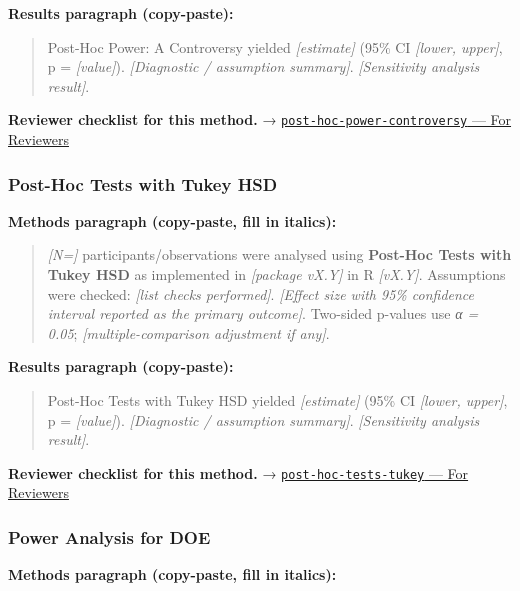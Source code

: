 \documentclass[
]{article}
\begin{document}
\textbf{Results paragraph (copy-paste):}

\begin{quote}
Post-Hoc Power: A Controversy yielded \emph{{[}estimate{]}} (95\% CI
\emph{{[}lower, upper{]}}, p = \emph{{[}value{]}}). \emph{{[}Diagnostic
/ assumption summary{]}}. \emph{{[}Sensitivity analysis result{]}}.
\end{quote}

\textbf{Reviewer checklist for this method.} →
\href{../chapters/05-power/post-hoc-power-controversy.Rmd\#for-reviewers}{\texttt{post-hoc-power-controversy}
--- For Reviewers}

\subsubsection{Post-Hoc Tests with Tukey
HSD}\label{post-hoc-tests-with-tukey-hsd}

\textbf{Methods paragraph (copy-paste, fill in italics):}

\begin{quote}
\emph{{[}N={]}} participants/observations were analysed using
\textbf{Post-Hoc Tests with Tukey HSD} as implemented in
\emph{{[}package vX.Y{]}} in R \emph{{[}vX.Y{]}}. Assumptions were
checked: \emph{{[}list checks performed{]}}. \emph{{[}Effect size with
95\% confidence interval reported as the primary outcome{]}}. Two-sided
p-values use \emph{α = 0.05}; \emph{{[}multiple-comparison adjustment if
any{]}}.
\end{quote}

\textbf{Results paragraph (copy-paste):}

\begin{quote}
Post-Hoc Tests with Tukey HSD yielded \emph{{[}estimate{]}} (95\% CI
\emph{{[}lower, upper{]}}, p = \emph{{[}value{]}}). \emph{{[}Diagnostic
/ assumption summary{]}}. \emph{{[}Sensitivity analysis result{]}}.
\end{quote}

\textbf{Reviewer checklist for this method.} →
\href{../chapters/04-inferential/post-hoc-tests-tukey.Rmd\#for-reviewers}{\texttt{post-hoc-tests-tukey}
--- For Reviewers}

\subsubsection{Power Analysis for DOE}\label{power-analysis-for-doe}

\textbf{Methods paragraph (copy-paste, fill in italics):}
\end{document}
